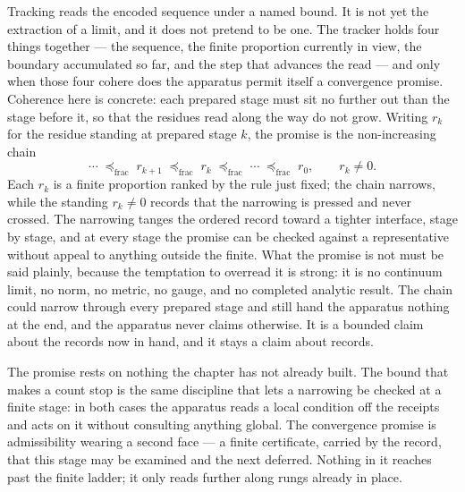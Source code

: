 Tracking reads the encoded sequence under a named bound. It is not yet the extraction of a limit, and it does not pretend to be one. The tracker holds four things together --- the sequence, the finite proportion currently in view, the boundary accumulated so far, and the step that advances the read --- and only when those four cohere does the apparatus permit itself a convergence promise. Coherence here is concrete: each prepared stage must sit no further out than the stage before it, so that the residues read along the way do not grow. Writing $r_k$ for the residue standing at prepared stage $k$, the promise is the non-increasing chain
\[ \cdots \;\preceq_{\mathrm{frac}}\; r_{k+1} \;\preceq_{\mathrm{frac}}\; r_k \;\preceq_{\mathrm{frac}}\; \cdots \;\preceq_{\mathrm{frac}}\; r_0, \qquad r_k \neq 0 . \]
Each $r_k$ is a finite proportion ranked by the rule just fixed; the chain narrows, while the standing $r_k \neq 0$ records that the narrowing is pressed and never crossed. The narrowing tanges the ordered record toward a tighter interface, stage by stage, and at every stage the promise can be checked against a representative without appeal to anything outside the finite. What the promise is not must be said plainly, because the temptation to overread it is strong: it is no continuum limit, no norm, no metric, no gauge, and no completed analytic result. The chain could narrow through every prepared stage and still hand the apparatus nothing at the end, and the apparatus never claims otherwise. It is a bounded claim about the records now in hand, and it stays a claim about records.

The promise rests on nothing the chapter has not already built. The bound that makes a count stop is the same discipline that lets a narrowing be checked at a finite stage: in both cases the apparatus reads a local condition off the receipts and acts on it without consulting anything global. The convergence promise is admissibility wearing a second face --- a finite certificate, carried by the record, that this stage may be examined and the next deferred. Nothing in it reaches past the finite ladder; it only reads further along rungs already in place.


